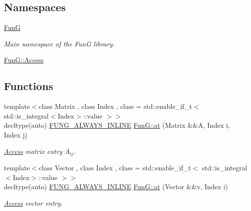 \subsection*{Namespaces}
\begin{DoxyCompactItemize}
\item 
 \hyperlink{namespaceFunG}{FunG}
\begin{DoxyCompactList}\small\item\em Main namespace of the FunG library. \end{DoxyCompactList}\item 
 \hyperlink{namespaceFunG_1_1Access}{Fun\+G\+::\+Access}
\end{DoxyCompactItemize}
\subsection*{Functions}
\begin{DoxyCompactItemize}
\item 
{\footnotesize template$<$class Matrix , class Index , class  = std\+::enable\+\_\+if\+\_\+t$<$ std\+::is\+\_\+integral$<$\+Index$>$\+::value $>$$>$ }\\decltype(auto) \hyperlink{macros_8hh_a03b9da186125795e5afa49d0ef1cc32f}{F\+U\+N\+G\+\_\+\+A\+L\+W\+A\+Y\+S\+\_\+\+I\+N\+L\+I\+NE} \hyperlink{namespaceFunG_aae631e6149505bdfc0b1c6162b370c7f}{Fun\+G\+::at} (Matrix \&\&A, Index i, Index j)
\begin{DoxyCompactList}\small\item\em \hyperlink{namespaceFunG_1_1Access}{Access} matrix entry $A_{ij}$. \end{DoxyCompactList}\item 
{\footnotesize template$<$class Vector , class Index , class  = std\+::enable\+\_\+if\+\_\+t$<$ std\+::is\+\_\+integral$<$\+Index$>$\+::value $>$$>$ }\\decltype(auto) \hyperlink{macros_8hh_a03b9da186125795e5afa49d0ef1cc32f}{F\+U\+N\+G\+\_\+\+A\+L\+W\+A\+Y\+S\+\_\+\+I\+N\+L\+I\+NE} \hyperlink{namespaceFunG_aa40271c9228c5ccee8a4973f27918630}{Fun\+G\+::at} (Vector \&\&v, Index i)
\begin{DoxyCompactList}\small\item\em \hyperlink{namespaceFunG_1_1Access}{Access} vector entry. \end{DoxyCompactList}\end{DoxyCompactItemize}
